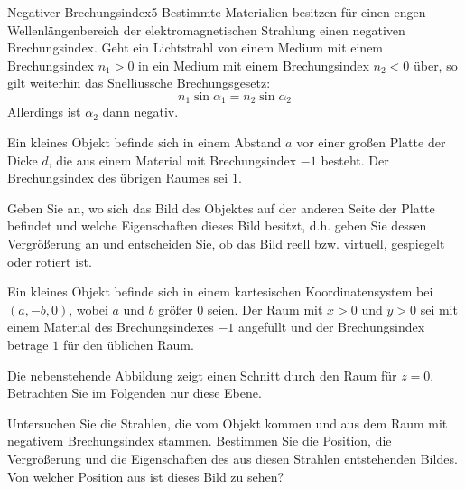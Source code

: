 \begin{problem}{Negativer Brechungsindex}{5}
Bestimmte Materialien besitzen für einen engen Wellenlängenbereich der elektromagnetischen Strahlung einen negativen Brechungsindex.  Geht ein Lichtstrahl von einem Medium mit einem Brechungsindex $n_1>0$ in ein Medium mit einem Brechungsindex $n_2<0$ über, so gilt weiterhin das Snelliussche Brechungsgesetz:
\begin{equation*}
  n_1\sin{\alpha_1}=n_2\sin{\alpha_2}
\end{equation*}
Allerdings ist $\alpha_2$ dann negativ.
\begin{abcenum}
  \item Ein kleines Objekt befinde sich in einem Abstand $a$ vor einer großen Platte der Dicke $d$, die aus einem Material mit Brechungsindex $-1$ besteht.  Der Brechungsindex des übrigen Raumes sei $1$.

Geben Sie an, wo sich das Bild des Objektes auf der anderen Seite der Platte befindet und welche Eigenschaften dieses Bild besitzt, d.h. geben Sie dessen Vergrößerung an und entscheiden Sie, ob das Bild reell bzw. virtuell, gespiegelt oder rotiert ist.
  \item Ein kleines Objekt befinde sich in einem kartesischen Koordinatensystem bei $(a,-b,0)$, wobei $a$ und $b$ größer $0$ seien.  Der Raum mit $x>0$ und $y>0$ sei mit einem Material des Brechungsindexes $-1$ angefüllt und der Brechungsindex betrage $1$ für den üblichen Raum.

Die nebenstehende Abbildung zeigt einen Schnitt durch den Raum für $z=0$.  Betrachten Sie im Folgenden nur diese Ebene.

Untersuchen Sie die Strahlen, die vom Objekt kommen und aus dem Raum mit negativem Brechungsindex stammen.  Bestimmen Sie die Position, die Vergrößerung und die Eigenschaften des aus diesen Strahlen entstehenden Bildes.  Von welcher Position aus ist dieses Bild zu sehen?
\end{abcenum}
\end{problem}

